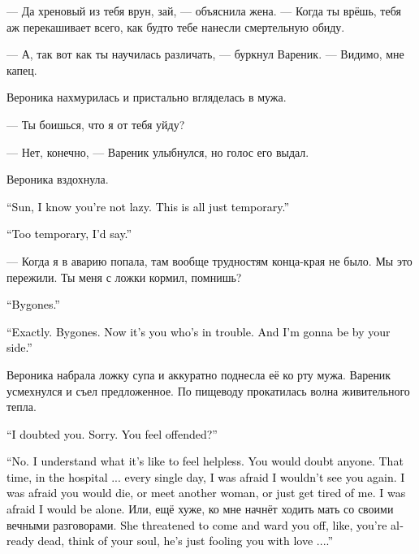 \documentclass[a4paper,10pt,fleqn]{book}\usepackage{polyglossia}\setdefaultlanguage{english}\setotherlanguage{russian}\defaultfontfeatures{Ligatures=TeX,Mapping=tex-text} \usepackage{xcolor}\definecolor{lightgray}{HTML}{bbbbbb}\color{lightgray}\newcommand{\ml}[3]{\textcolor{black}{#3}}
\begin{document}
--- Да хреновый из тебя врун, зай, --- объяснила жена.
--- Когда ты врёшь, тебя аж перекашивает всего, как будто тебе нанесли смертельную обиду.

--- А, так вот как ты научилась различать, --- буркнул Вареник.
--- Видимо, мне капец.

Вероника нахмурилась и пристально вгляделась в мужа.

--- Ты боишься, что я от тебя уйду?

--- Нет, конечно, --- Вареник улыбнулся, но голос его выдал.

Вероника вздохнула.

\ml{$0$}
{--- Солнце, я знаю, что ты не лентяй.}
{``Sun, I know you're not lazy.}
\ml{$0$}
{Это временные трудности.}
{This is all just temporary.''}

\ml{$0$}
{--- Да какие-то слишком временные.}
{``Too temporary, I'd say.''}

--- Когда я в аварию попала, там вообще трудностям конца-края не было.
Мы это пережили.
Ты меня с ложки кормил, помнишь?

\ml{$0$}
{--- Дело давнее.}
{``Bygones.''}

\ml{$0$}
{--- Именно.}
{``Exactly.}
\ml{$0$}
{Всё это позади.}
{Bygones.}
\ml{$0$}
{А сейчас трудности у тебя.}
{Now it's you who's in trouble.}
\ml{$0$}
{И я буду рядом.}
{And I'm gonna be by your side.''}

Вероника набрала ложку супа и аккуратно поднесла её ко рту мужа.
Вареник усмехнулся и съел предложенное.
По пищеводу прокатилась волна живительного тепла.

\ml{$0$}
{--- Я в тебе засомневался.}
{``I doubted you.}
\ml{$0$}
{Прости.}
{Sorry.}
\ml{$0$}
{Ты обиделась?}
{You feel offended?''}

\ml{$0$}
{--- Нет.}
{``No.}
\ml{$0$}
{Я знаю, каково чувствовать себя беспомощной.}
{I understand what it's like to feel helpless.}
\ml{$0$}
{Засомневаешься в ком угодно.}
{You would doubt anyone.}
\ml{$0$}
{Тогда, в больнице... я каждый день боялась, что тебя не дождусь.}
{That time, in the hospital ... every single day, I was afraid I wouldn't see you again.}
\ml{$0$}
{Что ты умрёшь, встретишь другую женщину, просто решишь, что я тебе надоела.}
{I was afraid you would die, or meet another woman, or just get tired of me.}
\ml{$0$}
{Что я просто останусь одна.}
{I was afraid I would be alone.}
Или, ещё хуже, ко мне начнёт ходить мать со своими вечными разговорами.
\ml{$0$}
{Она грозилась приехать и тебя отвадить, типа, ты уже труп, о душе думать надо, а он тебе голову любовью морочит...}
{She threatened to come and ward you off, like, you're already dead, think of your soul, he's just fooling you with love ....''}
\end{document}
